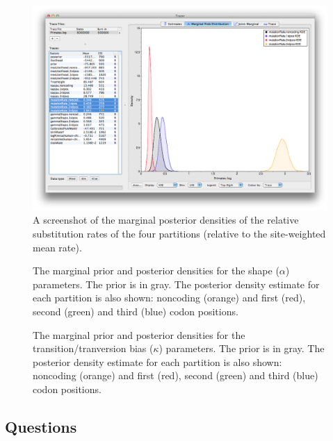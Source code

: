 \documentclass[11pt]{article}
\theoremstyle{plain}%
\theoremstyle{definition}
\theoremstyle{remark}
\begin{document}
\begin{figure}
\centering	
\includegraphics[width=\textwidth]{figures/Tracer_marginalDensity}
\caption{A screenshot of the marginal posterior densities of the relative substitution rates of the four partitions (relative to the site-weighted mean rate).}
\label{fig:Tracer_marginalDensity}
\end{figure}


\begin{figure}


\caption{The marginal prior and posterior densities for the shape ($\alpha$) parameters. The prior is in gray. The posterior density estimate for each partition is also shown: noncoding (orange) and first (red), second (green) and third (blue) codon positions.}
\label{fig:primatePriorPosteriorShape}
\end{figure}

\begin{figure}

\caption{The marginal prior and posterior densities for the transition/tranversion bias ($\kappa$) parameters. The prior is in gray. The posterior density estimate for each partition is also shown: noncoding (orange) and first (red), second (green) and third (blue) codon positions.}
\label{fig:primatePriorPosteriorKappa}
\end{figure}
\fi

\newpage
\subsection*{Questions}
\vspace{5 mm}
\end{document}
